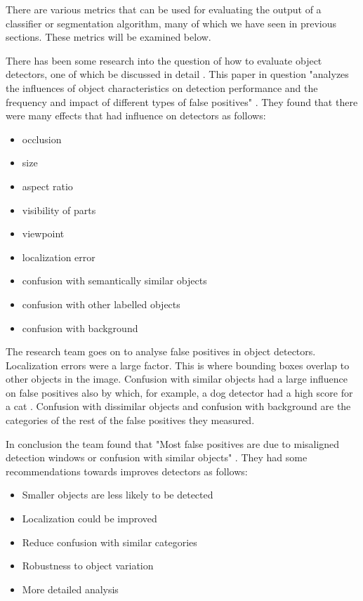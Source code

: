 There are various metrics that can be used for evaluating the output
of a classifier or segmentation algorithm, many of which we have seen in previous
sections. These metrics will be examined below.

There has been some research into the question of how to evaluate object
detectors, one of which be discussed in detail \parencite{diagnosingErrors}.
This paper in question "analyzes the influences of object characteristics on
detection performance and the frequency and impact of different types of false
positives" \parencite{diagnosingErrors}. They found that there were many effects
that had influence on detectors as follows:
\begin{itemize}
    \item{occlusion}
    \item{size}
    \item{aspect ratio}
    \item{visibility of parts}
    \item{viewpoint}
    \item{localization error}
    \item{confusion with semantically similar objects}
    \item{confusion with other labelled objects}
    \item{confusion with background}
\end{itemize}

The research team goes on to analyse false positives in object detectors.
Localization errors were a large factor. This is where bounding boxes overlap to
other objects in the image. Confusion with similar objects had a large influence
on false positives also by which, for example, a dog detector had a high score
for a cat \parencite{diagnosingErrors}. Confusion with dissimilar objects and
confusion with background are the categories of the rest of the false positives
they measured.

In conclusion the team found that "Most false positives are due to misaligned
detection windows or confusion with similar objects"
\parencite{diagnosingErrors}. They had some recommendations towards improves
detectors as follows:
\begin{itemize}
	\item{Smaller objects are less likely to be detected}
	\item{Localization could be improved}
	\item{Reduce confusion with similar categories}
	\item{Robustness to object variation}
	\item{More detailed analysis}
\end{itemize}

